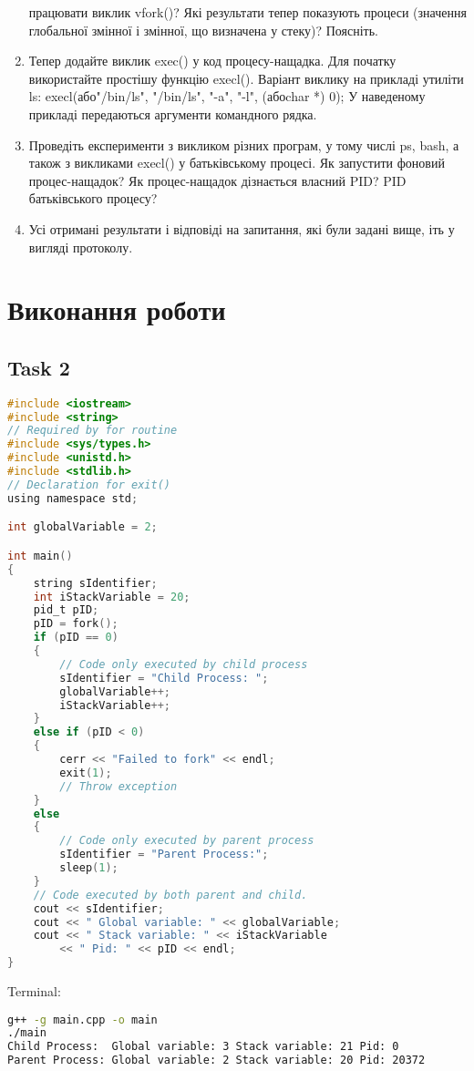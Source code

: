 \documentclass{article}
\begin{document}
\begin{enumerate}
	працювати виклик vfork()? Які результати тепер показують процеси
	(значення глобальної змінної і змінної, що визначена у стеку)?
	Поясніть.
	\item Тепер додайте виклик exec() у код процесу-нащадка. Для початку
	використайте простішу функцію execl(). Варіант виклику на
	прикладі утиліти ls:
	execl(або"/bin/ls", "/bin/ls", "-a", "-l", (абоchar *) 0);
	У наведеному прикладі передаються аргументи командного рядка.
	\item Проведіть експерименти з викликом різних програм, у тому числі ps,
	bash, а також з викликами execl() у батьківському процесі. Як
	запустити фоновий процес-нащадок? Як процес-нащадок дізнається
	власний PID? PID батьківського процесу?
	\item Усі отримані результати і відповіді на запитання, які були задані вище,
	іть у вигляді протоколу.
\end{enumerate}
\newpage

\section*{Виконання роботи}
\subsection*{Task 2}
\begin{lstlisting}[language=C]
#include <iostream>
#include <string>
// Required by for routine
#include <sys/types.h>
#include <unistd.h>
#include <stdlib.h>
// Declaration for exit()
using namespace std;

int globalVariable = 2;

int main()
{
	string sIdentifier;
	int iStackVariable = 20;
	pid_t pID;
	pID = fork();
	if (pID == 0)
	{
		// Code only executed by child process
		sIdentifier = "Child Process: ";
		globalVariable++;
		iStackVariable++;
	}
	else if (pID < 0)
	{
		cerr << "Failed to fork" << endl;
		exit(1);
		// Throw exception
	}
	else
	{
		// Code only executed by parent process
		sIdentifier = "Parent Process:";
		sleep(1);
	}
	// Code executed by both parent and child.
	cout << sIdentifier;
	cout << " Global variable: " << globalVariable;
	cout << " Stack variable: " << iStackVariable 
		<< " Pid: " << pID << endl;
}
\end{lstlisting}
Terminal:
\begin{lstlisting}[language=BASH]
g++ -g main.cpp -o main
./main
Child Process:  Global variable: 3 Stack variable: 21 Pid: 0
Parent Process: Global variable: 2 Stack variable: 20 Pid: 20372
\end{lstlisting}
\end{document}
